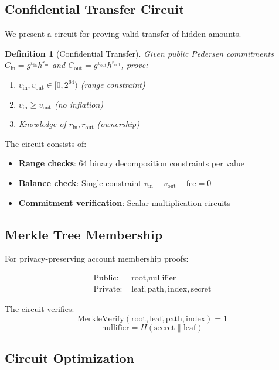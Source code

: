 \documentclass[11pt,a4paper]{article}
\newtheorem{definition}[theorem]{Definition}
\begin{document}
\subsection{Confidential Transfer Circuit}

We present a circuit for proving valid transfer of hidden amounts.

\begin{definition}[Confidential Transfer]
Given public Pedersen commitments $C_{\text{in}} = g^{v_{\text{in}}} h^{r_{\text{in}}}$ and $C_{\text{out}} = g^{v_{\text{out}}} h^{r_{\text{out}}}$, prove:
\begin{enumerate}[label=(\roman*)]
    \item $v_{\text{in}}, v_{\text{out}} \in [0, 2^{64})$ (range constraint)
    \item $v_{\text{in}} \geq v_{\text{out}}$ (no inflation)
    \item Knowledge of $r_{\text{in}}, r_{\text{out}}$ (ownership)
\end{enumerate}
\end{definition}

The circuit consists of:
\begin{itemize}
    \item \textbf{Range checks}: 64 binary decomposition constraints per value
    \item \textbf{Balance check}: Single constraint $v_{\text{in}} - v_{\text{out}} - \text{fee} = 0$
    \item \textbf{Commitment verification}: Scalar multiplication circuits
\end{itemize}

\subsection{Merkle Tree Membership}

For privacy-preserving account membership proofs:

\begin{align*}
\text{Public: } & \text{root}, \text{nullifier} \\
\text{Private: } & \text{leaf}, \text{path}, \text{index}, \text{secret}
\end{align*}

The circuit verifies:
\[
\text{MerkleVerify}(\text{root}, \text{leaf}, \text{path}, \text{index}) = 1
\]
\[
\text{nullifier} = H(\text{secret} \| \text{leaf})
\]

\subsection{Circuit Optimization}
\end{document}

